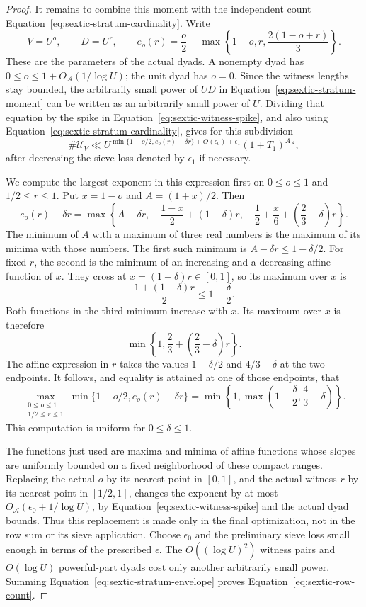 \documentclass[11pt,a4paper]{article}
\numberwithin{equation}{section}
\numberwithin{figure}{section}
\theoremstyle{definition}
\theoremstyle{remark}
\begin{document}
\begin{proof}
It remains to combine this moment with the independent count
Equation~\eqref{eq:sextic-stratum-cardinality}.  Write
\[
 V=U^o,\qquad D=U^r,\qquad
 e_o(r)=\frac o2+\max\left\{1-o,r,\frac{2(1-o+r)}3\right\}.
\]
These are the parameters of the actual dyads.  A nonempty dyad has
$0\le o\le1+O_{\mathcal A}(1/\log U)$; the unit dyad has $o=0$.
Since the witness lengths stay bounded, the arbitrarily small power of
$UD$ in Equation~\eqref{eq:sextic-stratum-moment} can be written as an
arbitrarily small power of $U$.  Dividing that equation by the spike in
Equation~\eqref{eq:sextic-witness-spike}, and also using
Equation~\eqref{eq:sextic-stratum-cardinality}, gives for this subdivision
\begin{equation}\label{eq:sextic-stratum-envelope}
 \#\mathcal U_V
 \ll U^{\min\{1-o/2,e_o(r)-\delta r\}+O(\epsilon_0)+\epsilon_1}
       (1+T_1)^{A_{\mathcal A}},
\end{equation}
after decreasing the sieve loss denoted by $\epsilon_1$ if necessary.

We compute the largest exponent in this expression first on
$0\le o\le1$ and $1/2\le r\le1$.  Put $x=1-o$ and $A=(1+x)/2$.  Then
\[
 e_o(r)-\delta r
 =\max\left\{
 A-\delta r,\quad
 \frac{1-x}{2}+(1-\delta)r,\quad
 \frac12+\frac x6+\left(\frac23-\delta\right)r
 \right\}.
\]
The minimum of $A$ with a maximum of three real numbers is the maximum
of its minima with those numbers.  The first such minimum is
$A-\delta r\le1-\delta/2$.  For fixed $r$, the second is the minimum of
an increasing and a decreasing affine function of $x$.  They cross at
$x=(1-\delta)r\in[0,1]$, so its maximum over $x$ is
\[
 \frac{1+(1-\delta)r}{2}\le1-\frac\delta2.
\]
Both functions in the third minimum increase with $x$.  Its maximum over
$x$ is therefore
\[
 \min\left\{1,\frac23+\left(\frac23-\delta\right)r\right\}.
\]
The affine expression in $r$ takes the values $1-\delta/2$ and
$4/3-\delta$ at the two endpoints.  It follows, and equality is attained
at one of those endpoints, that
\begin{equation}\label{eq:sextic-envelope-optimization}
 \max_{\substack{0\le o\le1\\1/2\le r\le1}}
 \min\{1-o/2,e_o(r)-\delta r\}
 =\min\left\{1,\max\left(1-\frac\delta2,\frac43-\delta\right)\right\}.
\end{equation}
This computation is uniform for $0\le\delta\le1$.

The functions just used are maxima and minima of affine functions whose
slopes are uniformly bounded on a fixed neighborhood of these compact
ranges.  Replacing the actual $o$ by its nearest point in $[0,1]$, and
the actual witness $r$ by its nearest point in $[1/2,1]$, changes the
exponent by at most $O_{\mathcal A}(\epsilon_0+1/\log U)$, by
Equation~\eqref{eq:sextic-witness-spike} and the actual dyad bounds.
Thus this replacement is made only in the final optimization, not in the
row sum or its sieve application.  Choose $\epsilon_0$ and the preliminary
sieve loss small enough in terms of the prescribed $\epsilon$.  The
$O((\log U)^2)$ witness pairs and $O(\log U)$ powerful-part dyads cost
only another arbitrarily small power.  Summing
Equation~\eqref{eq:sextic-stratum-envelope} proves
Equation~\eqref{eq:sextic-row-count}.


\end{proof}
\end{document}
